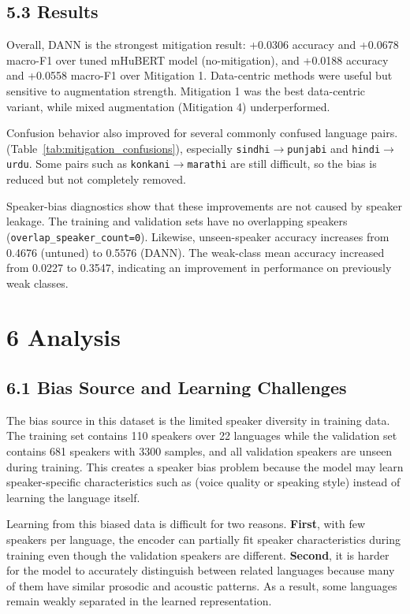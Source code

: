 \documentclass[11pt]{article}
\begin{document}
\subsection*{5.3 Results}
Overall, DANN is the strongest mitigation result: +0.0306 accuracy and +0.0678 macro-F1 over tuned mHuBERT model (no-mitigation), and +0.0188 accuracy and +0.0558 macro-F1 over Mitigation 1. Data-centric methods were useful but sensitive to augmentation strength. Mitigation 1 was the best data-centric variant, while mixed augmentation (Mitigation 4) underperformed.

Confusion behavior also improved for several commonly confused language pairs. (Table~\ref{tab:mitigation_confusions}), especially \texttt{sindhi$\rightarrow$punjabi} and \texttt{hindi$\rightarrow$urdu}. Some pairs such as \texttt{konkani$\rightarrow$marathi} are still difficult, so the bias is reduced but not completely removed.

Speaker-bias diagnostics show that these improvements are not caused by speaker leakage. The training and validation sets have no overlapping speakers (\texttt{overlap\_speaker\_count=0}). 
Likewise, unseen-speaker accuracy increases from 0.4676 (untuned) to 0.5576 (DANN). The weak-class mean accuracy increased from 0.0227 to 0.3547, indicating an improvement in performance on previously weak classes. 

\section*{6 Analysis}
\subsection*{6.1 Bias Source and Learning Challenges}
The bias source in this dataset is the limited speaker diversity in training data. The training set contains 110 speakers over 22 languages while the validation set contains 681 speakers with 3300 samples, and all validation speakers are unseen during training. 
This creates a speaker bias problem because the model may learn speaker-specific characteristics such as (voice quality or speaking style) instead of learning the language itself.

Learning from this biased data is difficult for two reasons. \textbf{First}, with few speakers per language, the encoder can partially fit speaker characteristics during training even though the validation speakers are different. 
\textbf{Second}, it is harder for the model to accurately distinguish between related languages because many of them have similar prosodic and acoustic patterns. As a result, some languages remain weakly separated in the learned representation.
\end{document}

